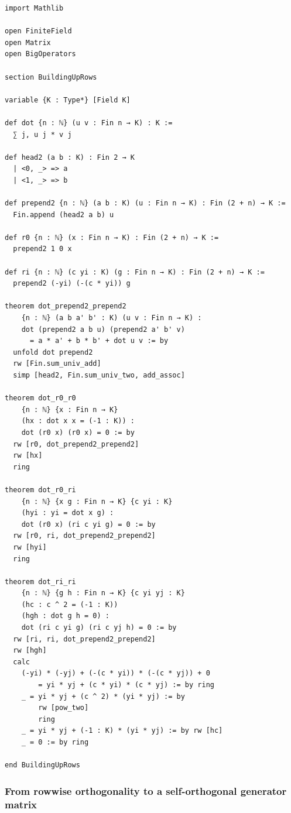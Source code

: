 \documentclass[12pt]{article}
\begin{document}
\begin{lstlisting}[caption={Lean verification for Lemma~\ref{lem:row-orthogonality}.}]
import Mathlib

open FiniteField
open Matrix
open BigOperators

section BuildingUpRows

variable {K : Type*} [Field K]

def dot {n : ℕ} (u v : Fin n → K) : K :=
  ∑ j, u j * v j

def head2 (a b : K) : Fin 2 → K
  | <0, _> => a
  | <1, _> => b

def prepend2 {n : ℕ} (a b : K) (u : Fin n → K) : Fin (2 + n) → K :=
  Fin.append (head2 a b) u

def r0 {n : ℕ} (x : Fin n → K) : Fin (2 + n) → K :=
  prepend2 1 0 x

def ri {n : ℕ} (c yi : K) (g : Fin n → K) : Fin (2 + n) → K :=
  prepend2 (-yi) (-(c * yi)) g

theorem dot_prepend2_prepend2
    {n : ℕ} (a b a' b' : K) (u v : Fin n → K) :
    dot (prepend2 a b u) (prepend2 a' b' v)
      = a * a' + b * b' + dot u v := by
  unfold dot prepend2
  rw [Fin.sum_univ_add]
  simp [head2, Fin.sum_univ_two, add_assoc]

theorem dot_r0_r0
    {n : ℕ} {x : Fin n → K}
    (hx : dot x x = (-1 : K)) :
    dot (r0 x) (r0 x) = 0 := by
  rw [r0, dot_prepend2_prepend2]
  rw [hx]
  ring

theorem dot_r0_ri
    {n : ℕ} {x g : Fin n → K} {c yi : K}
    (hyi : yi = dot x g) :
    dot (r0 x) (ri c yi g) = 0 := by
  rw [r0, ri, dot_prepend2_prepend2]
  rw [hyi]
  ring

theorem dot_ri_ri
    {n : ℕ} {g h : Fin n → K} {c yi yj : K}
    (hc : c ^ 2 = (-1 : K))
    (hgh : dot g h = 0) :
    dot (ri c yi g) (ri c yj h) = 0 := by
  rw [ri, ri, dot_prepend2_prepend2]
  rw [hgh]
  calc
    (-yi) * (-yj) + (-(c * yi)) * (-(c * yj)) + 0
        = yi * yj + (c * yi) * (c * yj) := by ring
    _ = yi * yj + (c ^ 2) * (yi * yj) := by
        rw [pow_two]
        ring
    _ = yi * yj + (-1 : K) * (yi * yj) := by rw [hc]
    _ = 0 := by ring

end BuildingUpRows
\end{lstlisting}

\subsubsection{From rowwise orthogonality to a self-orthogonal generator matrix}
\end{document}
